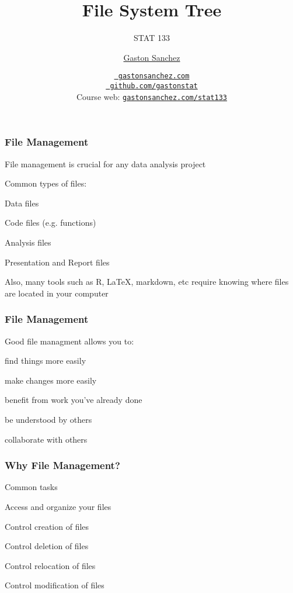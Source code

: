 \documentclass[12pt]{beamer}\usepackage[]{graphicx}\usepackage[]{color}
\title{File System Tree}
\subtitle{STAT 133}
\author{\href{http://www.gastonsanchez.com}{Gaston Sanchez}}
\institute{Department of Statistics, UC{\textendash}Berkeley}
\date{\href{http://www.gastonsanchez.com}{\tt \scriptsize \color{foreground} gastonsanchez.com}
\\[-4pt]
\href{http://github.com/gastonstat}{\tt \scriptsize \color{foreground} github.com/gastonstat}
\\[-4pt]
{\scriptsize Course web: \href{http://www.gastonsanchez.com/stat133}{\tt gastonsanchez.com/stat133}}
}
\begin{document}
{
  \frame{
    \titlepage
  } 
}


\begin{frame}
\begin{center}
\Huge{}
\end{center}
\end{frame}


\begin{frame}
\frametitle{File Management}

File management is crucial for any data analysis project

Common types of files:
\bi
  \item Data files
  \item Code files (e.g. functions)
  \item Analysis files
  \item Presentation and Report files
\ei

Also, many tools such as R, LaTeX, markdown, etc require knowing where files are located in your computer
\end{frame}


\begin{frame}
\frametitle{File Management}

Good file managment allows you to:
\bi
  \item find things more easily
  \item make changes more easily
  \item benefit from work you've already done
  \item be understood by others
  \item collaborate with others
\ei

\end{frame}


\begin{frame}
\frametitle{Why File Management?}

Common tasks
\bi
  \item Access and organize your files
  \item Control creation of files
  \item Control deletion of files
  \item Control relocation of files
  \item Control modification of files
\ei

\end{frame}
\end{document}
